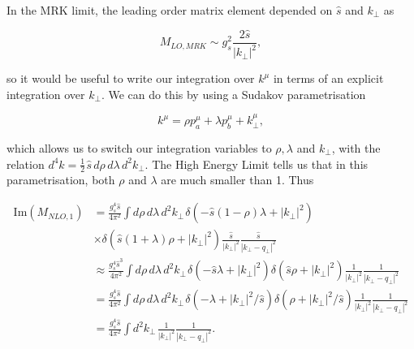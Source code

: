 In the MRK limit, the leading order matrix element depended on $\hat{s}$ and $k_\perp$ as

\begin{equation}
M_{LO, MRK} \sim g_s^2 \frac{2 \hat{s}}{|k_\perp|^2},
\end{equation}

so it would be useful to write our integration over $k^\mu$ in terms of an explicit integration over $k_\perp$. We can do this by using a Sudakov parametrisation

\begin{equation}
k^\mu = \rho p_a^\mu + \lambda p_b ^\mu + k_\perp^\mu,
\end{equation}

which allows us to switch our integration variables to $\rho, \lambda$ and $k_\perp$, with the relation $d^4k = \frac{1}{2} \hspace{1pt} \hat{s} \hspace{2pt} d \rho \hspace{2pt} d \lambda \hspace{2pt} d^2 k_\perp$. The High Energy Limit tells us that in this parametrisation, both $\rho$ and $\lambda$ are much smaller than 1. Thus

\begin{equation}
\begin{split}
\text{Im}(M_{NLO,1}) & = \frac{g_s^4 \hat{s}}{ 4 \pi^2} \int d \rho \hspace{2pt} d \lambda \hspace{2pt} d^2 k_\perp \hspace{1pt} \delta(-\hat{s}(1-\rho) \lambda + |k_\perp|^2) \\
& \times \delta(\hat{s}(1+ \lambda) \rho + |k_\perp|^2) \frac{\hat{s}}{|k_\perp|^2} \frac{\hat{s}}{|k_\perp - q_\perp|^2}  \\
& \approx \frac{g_s^4 \hat{s}^3}{ 4 \pi^2} \int d \rho \hspace{2pt} d \lambda \hspace{2pt} d^2 k_\perp \hspace{1pt} \delta(-\hat{s} \lambda + |k_\perp|^2) \delta(\hat{s} \rho + |k_\perp|^2) \frac{1}{|k_\perp|^2} \frac{1}{|k_\perp - q_\perp|^2}  \\
&= \frac{g_s^4 \hat{s}}{ 4 \pi^2} \int d \rho \hspace{2pt} d \lambda \hspace{2pt} d^2 k_\perp \hspace{1pt} \delta(-\lambda + |k_\perp|^2/\hat{s}) \delta(\rho + |k_\perp|^2/\hat{s}) \frac{1}{|k_\perp|^2} \frac{1}{|k_\perp - q_\perp|^2} \\
&= \frac{g_s^4 \hat{s}}{ 4 \pi^2} \int d^2 k_\perp \hspace{1pt}  \frac{1}{|k_\perp|^2} \frac{1}{|k_\perp - q_\perp|^2}.
\end{split}
\end{equation}


